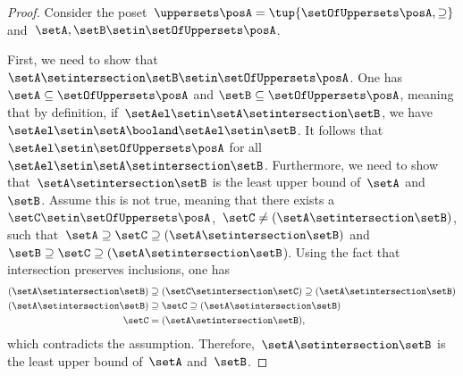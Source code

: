 \begin{proof}
    Consider the poset~$\uppersets \posA=\tup{\setOfUppersets \posA,\supseteq}$ and~$\setA,\setB\setin \setOfUppersets \posA$.

    First, we need to show that~$\setA\setintersection \setB\setin \setOfUppersets \posA$.
    One has~$\setA \subseteq \setOfUppersets \posA$ and $\setB\subseteq \setOfUppersets \posA$, meaning that by definition, if~$\setAel\setin \setA\setintersection \setB$, we have~$\setAel \setin \setA \booland \setAel \setin \setB$.
    It follows that~$\setAel \setin \setOfUppersets \posA$ for all~$\setAel \setin \setA\setintersection \setB$.
    Furthermore, we need to show that~$\setA\setintersection \setB$ is the least upper bound of~$\setA$ and~$\setB$.
    Assume this is not true, meaning that there exists a~$\setC\setin \setOfUppersets \posA$,~$\setC\neq (\setA\setintersection \setB)$, such that~$\setA\supseteq \setC\supseteq (\setA\setintersection \setB)$ and~$\setB\supseteq \setC\supseteq (\setA\setintersection \setB$).
        Using the fact that intersection preserves inclusions, one has
        \begin{equation}
            \begin{aligned}
                (\setA\setintersection \setB)
                                              & \supseteq (\setC\setintersection \setC) \supseteq (\setA\setintersection \setB ) \\
                (\setA\setintersection \setB) & \supseteq \setC \supseteq (\setA\setintersection \setB ) \\
                \setC                         & = (\setA\setintersection \setB),
            \end{aligned}
        \end{equation}
        which contradicts the assumption.
        Therefore,~$\setA\setintersection \setB$ is the least upper bound of~$\setA$ and~$\setB$.


\end{proof}
